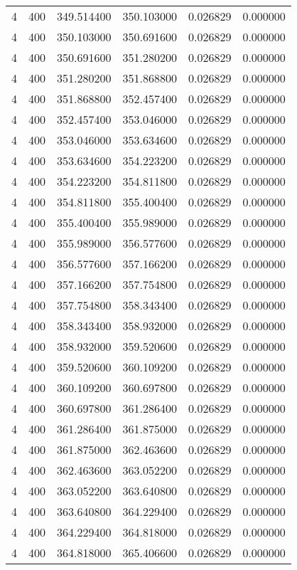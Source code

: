 \begin{longtable}{rrrrrr}
4 & 400 & 349.514400 & 350.103000 & 0.026829 & 0.000000 \\
4 & 400 & 350.103000 & 350.691600 & 0.026829 & 0.000000 \\
4 & 400 & 350.691600 & 351.280200 & 0.026829 & 0.000000 \\
4 & 400 & 351.280200 & 351.868800 & 0.026829 & 0.000000 \\
4 & 400 & 351.868800 & 352.457400 & 0.026829 & 0.000000 \\
4 & 400 & 352.457400 & 353.046000 & 0.026829 & 0.000000 \\
4 & 400 & 353.046000 & 353.634600 & 0.026829 & 0.000000 \\
4 & 400 & 353.634600 & 354.223200 & 0.026829 & 0.000000 \\
4 & 400 & 354.223200 & 354.811800 & 0.026829 & 0.000000 \\
4 & 400 & 354.811800 & 355.400400 & 0.026829 & 0.000000 \\
4 & 400 & 355.400400 & 355.989000 & 0.026829 & 0.000000 \\
4 & 400 & 355.989000 & 356.577600 & 0.026829 & 0.000000 \\
4 & 400 & 356.577600 & 357.166200 & 0.026829 & 0.000000 \\
4 & 400 & 357.166200 & 357.754800 & 0.026829 & 0.000000 \\
4 & 400 & 357.754800 & 358.343400 & 0.026829 & 0.000000 \\
4 & 400 & 358.343400 & 358.932000 & 0.026829 & 0.000000 \\
4 & 400 & 358.932000 & 359.520600 & 0.026829 & 0.000000 \\
4 & 400 & 359.520600 & 360.109200 & 0.026829 & 0.000000 \\
4 & 400 & 360.109200 & 360.697800 & 0.026829 & 0.000000 \\
4 & 400 & 360.697800 & 361.286400 & 0.026829 & 0.000000 \\
4 & 400 & 361.286400 & 361.875000 & 0.026829 & 0.000000 \\
4 & 400 & 361.875000 & 362.463600 & 0.026829 & 0.000000 \\
4 & 400 & 362.463600 & 363.052200 & 0.026829 & 0.000000 \\
4 & 400 & 363.052200 & 363.640800 & 0.026829 & 0.000000 \\
4 & 400 & 363.640800 & 364.229400 & 0.026829 & 0.000000 \\
4 & 400 & 364.229400 & 364.818000 & 0.026829 & 0.000000 \\
4 & 400 & 364.818000 & 365.406600 & 0.026829 & 0.000000 \\

\end{longtable}
